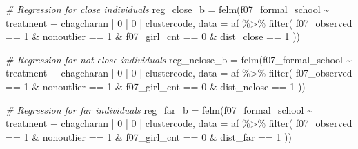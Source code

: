 \documentclass[
]{article}
\newenvironment{Shaded}{\begin{snugshade}}{\end{snugshade}}
\newcommand{\AttributeTok}[1]{\textcolor[rgb]{0.77,0.63,0.00}{#1}}
\newcommand{\CommentTok}[1]{\textcolor[rgb]{0.56,0.35,0.01}{\textit{#1}}}
\newcommand{\DecValTok}[1]{\textcolor[rgb]{0.00,0.00,0.81}{#1}}
\newcommand{\FunctionTok}[1]{\textcolor[rgb]{0.00,0.00,0.00}{#1}}
\newcommand{\NormalTok}[1]{#1}
\newcommand{\OtherTok}[1]{\textcolor[rgb]{0.56,0.35,0.01}{#1}}
\newcommand{\SpecialCharTok}[1]{\textcolor[rgb]{0.00,0.00,0.00}{#1}}
\begin{document}
\begin{Shaded}
\begin{Highlighting}[]
\CommentTok{\# Regression for close individuals}
\NormalTok{reg\_close\_b }\OtherTok{=} \FunctionTok{felm}\NormalTok{(f07\_formal\_school }\SpecialCharTok{\textasciitilde{}}\NormalTok{ treatment }\SpecialCharTok{+} 
\NormalTok{                   chagcharan }\SpecialCharTok{|} \DecValTok{0} \SpecialCharTok{|} \DecValTok{0} \SpecialCharTok{|}\NormalTok{ clustercode,}
         \AttributeTok{data =}\NormalTok{ af }\SpecialCharTok{\%\textgreater{}\%} \FunctionTok{filter}\NormalTok{( }
\NormalTok{                              f07\_observed }\SpecialCharTok{==} \DecValTok{1} \SpecialCharTok{\&}
\NormalTok{                              nonoutlier }\SpecialCharTok{==} \DecValTok{1} \SpecialCharTok{\&}
\NormalTok{                              f07\_girl\_cnt }\SpecialCharTok{==} \DecValTok{0} \SpecialCharTok{\&}
\NormalTok{                              dist\_close }\SpecialCharTok{==} \DecValTok{1}
\NormalTok{                              ))}

\CommentTok{\# Regression for not close individuals}
\NormalTok{reg\_nclose\_b }\OtherTok{=} \FunctionTok{felm}\NormalTok{(f07\_formal\_school }\SpecialCharTok{\textasciitilde{}}\NormalTok{ treatment }\SpecialCharTok{+} 
\NormalTok{                   chagcharan }\SpecialCharTok{|} \DecValTok{0} \SpecialCharTok{|} \DecValTok{0} \SpecialCharTok{|}\NormalTok{ clustercode,}
         \AttributeTok{data =}\NormalTok{ af }\SpecialCharTok{\%\textgreater{}\%} \FunctionTok{filter}\NormalTok{( }
\NormalTok{                              f07\_observed }\SpecialCharTok{==} \DecValTok{1} \SpecialCharTok{\&}
\NormalTok{                              nonoutlier }\SpecialCharTok{==} \DecValTok{1} \SpecialCharTok{\&}
\NormalTok{                              f07\_girl\_cnt }\SpecialCharTok{==} \DecValTok{0} \SpecialCharTok{\&}
\NormalTok{                              dist\_nclose }\SpecialCharTok{==} \DecValTok{1}
\NormalTok{                              ))}

\CommentTok{\# Regression for far individuals}
\NormalTok{reg\_far\_b }\OtherTok{=} \FunctionTok{felm}\NormalTok{(f07\_formal\_school }\SpecialCharTok{\textasciitilde{}}\NormalTok{ treatment }\SpecialCharTok{+} 
\NormalTok{                   chagcharan }\SpecialCharTok{|} \DecValTok{0} \SpecialCharTok{|} \DecValTok{0} \SpecialCharTok{|}\NormalTok{ clustercode,}
         \AttributeTok{data =}\NormalTok{ af }\SpecialCharTok{\%\textgreater{}\%} \FunctionTok{filter}\NormalTok{( }
\NormalTok{                              f07\_observed }\SpecialCharTok{==} \DecValTok{1} \SpecialCharTok{\&}
\NormalTok{                              nonoutlier }\SpecialCharTok{==} \DecValTok{1} \SpecialCharTok{\&}
\NormalTok{                              f07\_girl\_cnt }\SpecialCharTok{==} \DecValTok{0} \SpecialCharTok{\&}
\NormalTok{                              dist\_far }\SpecialCharTok{==} \DecValTok{1}
\NormalTok{                              ))}
\end{Highlighting}
\end{Shaded}
\end{document}
